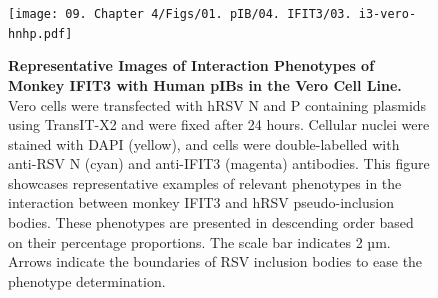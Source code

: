 \begin{figure}
    \centering
    \texttt{[image: 09. Chapter 4/Figs/01. pIB/04. IFIT3/03. i3-vero-hnhp.pdf]}
    \caption[Representative Images of Interaction Phenotypes of Monkey IFIT3 with Human pIBs in the Vero Cell Line.]{\textbf{Representative Images of Interaction Phenotypes of Monkey IFIT3 with Human pIBs in the Vero Cell Line.} Vero cells were transfected with hRSV N and P containing plasmids using TransIT-X2 and were fixed after 24 hours. Cellular nuclei were stained with DAPI (yellow), and cells were double-labelled with anti-RSV N (cyan) and anti-IFIT3 (magenta) antibodies. This figure showcases representative examples of relevant phenotypes in the interaction between monkey IFIT3 and hRSV pseudo-inclusion bodies. These phenotypes are presented in descending order based on their percentage proportions. The scale bar indicates 2 µm. Arrows indicate the boundaries of RSV inclusion bodies to ease the phenotype determination.}
    \label{fig:Representative Images of Interaction Phenotypes of Monkey IFIT3 with Human pIBs in the VERO Cell Line}
\end{figure}

